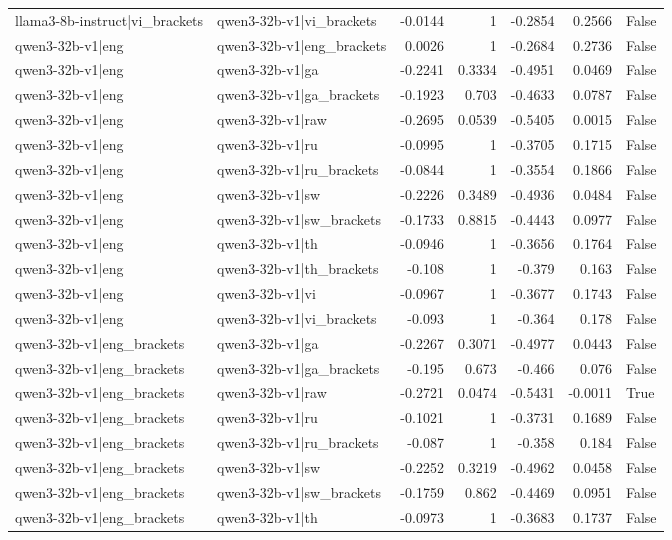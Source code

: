 \begin{table}
\begin{tabular}{l l r r r r l}
llama3-8b-instruct|vi_brackets & qwen3-32b-v1|vi_brackets & -0.0144 & 1 & -0.2854 & 0.2566 & False \\
qwen3-32b-v1|eng & qwen3-32b-v1|eng_brackets & 0.0026 & 1 & -0.2684 & 0.2736 & False \\
qwen3-32b-v1|eng & qwen3-32b-v1|ga & -0.2241 & 0.3334 & -0.4951 & 0.0469 & False \\
qwen3-32b-v1|eng & qwen3-32b-v1|ga_brackets & -0.1923 & 0.703 & -0.4633 & 0.0787 & False \\
qwen3-32b-v1|eng & qwen3-32b-v1|raw & -0.2695 & 0.0539 & -0.5405 & 0.0015 & False \\
qwen3-32b-v1|eng & qwen3-32b-v1|ru & -0.0995 & 1 & -0.3705 & 0.1715 & False \\
qwen3-32b-v1|eng & qwen3-32b-v1|ru_brackets & -0.0844 & 1 & -0.3554 & 0.1866 & False \\
qwen3-32b-v1|eng & qwen3-32b-v1|sw & -0.2226 & 0.3489 & -0.4936 & 0.0484 & False \\
qwen3-32b-v1|eng & qwen3-32b-v1|sw_brackets & -0.1733 & 0.8815 & -0.4443 & 0.0977 & False \\
qwen3-32b-v1|eng & qwen3-32b-v1|th & -0.0946 & 1 & -0.3656 & 0.1764 & False \\
qwen3-32b-v1|eng & qwen3-32b-v1|th_brackets & -0.108 & 1 & -0.379 & 0.163 & False \\
qwen3-32b-v1|eng & qwen3-32b-v1|vi & -0.0967 & 1 & -0.3677 & 0.1743 & False \\
qwen3-32b-v1|eng & qwen3-32b-v1|vi_brackets & -0.093 & 1 & -0.364 & 0.178 & False \\
qwen3-32b-v1|eng_brackets & qwen3-32b-v1|ga & -0.2267 & 0.3071 & -0.4977 & 0.0443 & False \\
qwen3-32b-v1|eng_brackets & qwen3-32b-v1|ga_brackets & -0.195 & 0.673 & -0.466 & 0.076 & False \\
qwen3-32b-v1|eng_brackets & qwen3-32b-v1|raw & -0.2721 & 0.0474 & -0.5431 & -0.0011 & True \\
qwen3-32b-v1|eng_brackets & qwen3-32b-v1|ru & -0.1021 & 1 & -0.3731 & 0.1689 & False \\
qwen3-32b-v1|eng_brackets & qwen3-32b-v1|ru_brackets & -0.087 & 1 & -0.358 & 0.184 & False \\
qwen3-32b-v1|eng_brackets & qwen3-32b-v1|sw & -0.2252 & 0.3219 & -0.4962 & 0.0458 & False \\
qwen3-32b-v1|eng_brackets & qwen3-32b-v1|sw_brackets & -0.1759 & 0.862 & -0.4469 & 0.0951 & False \\
qwen3-32b-v1|eng_brackets & qwen3-32b-v1|th & -0.0973 & 1 & -0.3683 & 0.1737 & False \\

\end{tabular}
\end{table}

